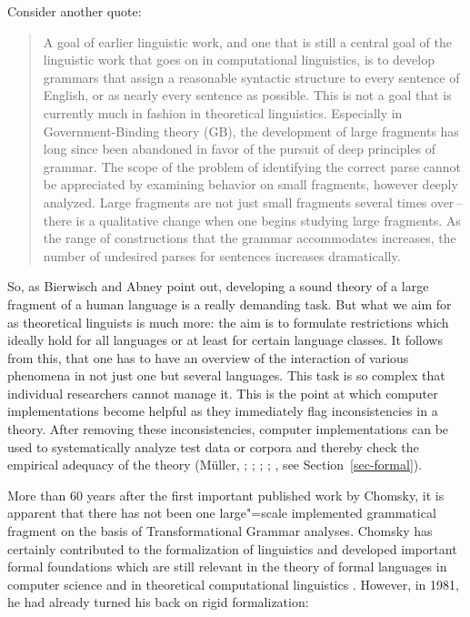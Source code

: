 Consider another quote:
\begin{quote}
A goal of earlier linguistic work, and one that is still a central goal of the
linguistic work that goes on in computational linguistics, is to develop grammars
that assign a reasonable syntactic structure to every sentence of English,
or as nearly every sentence as possible. This is not a goal that is currently much
in fashion in theoretical linguistics. Especially in Government-Binding theory
(GB), the development of large fragments has long since been abandoned in
favor of the pursuit of deep principles of grammar.
The scope of the problem of identifying the correct parse cannot be appreciated
by examining behavior on small fragments, however deeply analyzed.
Large fragments are not just small fragments several times over\,--\,there is a
qualitative change when one begins studying large fragments. As the range of
constructions that the grammar accommodates increases, the number of undesired parses for sentences
increases dramatically. \citep[]{Abney96a}
\end{quote}
%
So, as Bierwisch and Abney point out, developing a sound theory of a large fragment of a human
language is a really demanding task. But what we aim for as theoretical linguists is much more: the aim is to formulate restrictions which ideally hold for all languages or at least
for certain language classes. It follows from this, that one has to have an overview of the interaction of various phenomena in
not just one but several languages. This task is so complex that individual researchers cannot manage it. This is
the point at which computer implementations become helpful as they immediately flag inconsistencies in a theory. 
After removing these inconsistencies, computer implementations can be used to systematically analyze test data
or corpora and thereby check the empirical adequacy of the theory
(Müller, \citeyear[Chapter~22]{Mueller99a}; \citeyear{MuellerCoreGram}; \citeyear{MuellerKernigkeit}; \citealp{OF98}; \citealp{Bender2008c}, see Section~\ref{sec-formal}).

More than 60 years after the first important published work by Chomsky, it is apparent that there has not been
one large"=scale implemented grammatical fragment on the basis of Transformational Grammar analyses. Chomsky
has certainly contributed to the formalization of linguistics and developed important formal foundations which
are still relevant in the theory of formal languages in computer science and
in theoretical computational linguistics \citep{Chomsky59a-u}. However, in 1981, he had already turned his back on rigid
formalization:

